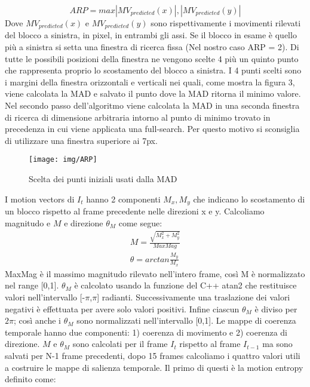 \documentclass[12pt,twocolumn]{IEEEtran}
\begin{document}
			\begin{equation}
			ARP = max{|MV_{predicted}(x)|,|MV_{predicted}(y)|}
			\end{equation}
			Dove $MV_{predicted}(x)$ e $MV_{predicted}(y)$ sono rispettivamente i movimenti rilevati del blocco a sinistra, in pixel, in entrambi gli assi. Se il blocco in esame è quello più a sinistra si setta una finestra di ricerca fissa (Nel nostro caso ARP = 2). Di tutte le possibili posizioni della finestra ne vengono scelte 4 più un quinto punto che rappresenta proprio lo scostamento del blocco a sinistra. I 4 punti scelti sono i margini della finestra orizzontali e verticali nei quali, come mostra la figura 3, viene calcolata la MAD e salvato il punto dove la MAD ritorna il minimo valore.\newline
			Nel secondo passo dell'algoritmo viene calcolata la MAD in una seconda finestra di ricerca di dimensione arbitraria intorno al punto di minimo trovato in precedenza in cui viene applicata una full-search. Per questo motivo si sconsiglia di utilizzare una finestra superiore ai 7px.
			\begin{figure}[h]
			\caption{Scelta dei punti iniziali usati dalla MAD}
			\begin{center}
			\texttt{[image: img/ARP]}
			\end{center}
			\end{figure}
			I motion vectors di $I_t$ hanno 2 componenti $M_x,M_y$ che indicano lo scostamento di un blocco rispetto al frame precedente nelle direzioni x e y. Calcoliamo magnitudo e $M$ e direzione $\theta_M$ come segue:\newline
			\begin{equation}
			\begin{aligned}
				M = \frac{\sqrt{M_x^2+M_y^2}}{MaxMag} \\
				\theta = arctan \frac{M_y}{M_x}
			\end{aligned}
			\end{equation}
			MaxMag è il massimo magnitudo rilevato nell'intero frame, così M è normalizzato nel range [0,1]. $\theta_M$ è calcolato usando la funzione del C++ atan2 che restituisce valori nell'intervallo [-$\pi$,$\pi$] radianti. Successivamente una traslazione dei valori negativi è effettuata per avere solo valori positivi. Infine ciascun $\theta_M$ è diviso per $2\pi$; così anche i $\theta_M$ sono normalizzati nell'intervallo [0,1].\newline
			Le mappe di coerenza temporale hanno due componenti: 1) coerenza di movimento e 2) coerenza di direzione. $M$ e $\theta_M$ sono calcolati per il frame $I_t$ rispetto al frame $I_{t-1}$ ma sono salvati per N-1 frame precedenti, dopo 15 frames calcoliamo i quattro valori utili a costruire le mappe di salienza temporale. Il primo di questi è la motion entropy definito come:
\end{document}
